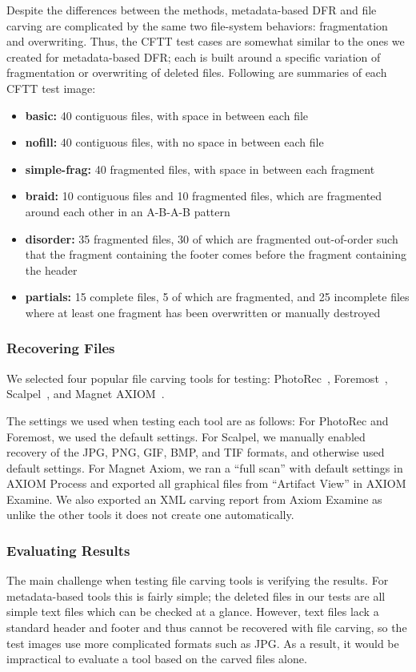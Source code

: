 Despite the differences between the methods, metadata-based DFR and file carving are complicated by the same two file-system behaviors: fragmentation and overwriting. Thus, the CFTT test cases are somewhat similar to the ones we created for metadata-based DFR; each is built around a specific variation of fragmentation or overwriting of deleted files.
Following are summaries of each CFTT test image:
\begin{itemize}
 \item \textbf{basic:} 40 contiguous files, with space in between each file
 \item \textbf{nofill:} 40 contiguous files, with no space in between each file
 \item \textbf{simple-frag:} 40 fragmented files, with space in between each fragment
 \item \textbf{braid:} 10 contiguous files and 10 fragmented files, which are fragmented around each other in an A-B-A-B pattern
 \item \textbf{disorder:} 35 fragmented files, 30 of which are fragmented out-of-order such that the fragment containing the footer comes before the fragment containing the header
 \item \textbf{partials:} 15 complete files, 5 of which are fragmented, and 25 incomplete files where at least one fragment has been overwritten or manually destroyed

\end{itemize}


\subsubsection{Recovering Files}

 We selected four popular file carving tools for testing: PhotoRec~\cite{photorec}, Foremost~\cite{foremost}, Scalpel~\cite{scalpel}, and Magnet AXIOM~\cite{axiom}.

The settings we used when testing each tool are as follows:
For PhotoRec and Foremost, we used the default settings.
For Scalpel, we manually enabled recovery of the JPG, PNG, GIF, BMP, and TIF formats, and otherwise used default settings.
For Magnet Axiom, we ran a ``full scan'' with default settings in AXIOM Process and exported all graphical files from ``Artifact View'' in AXIOM Examine.
We also exported an XML carving report from Axiom Examine as unlike the other tools it does not create one automatically.

\subsubsection{Evaluating Results}
The main challenge when testing file carving tools is verifying the results. 
For metadata-based tools this is fairly simple; the deleted files in our tests are all simple text files which can be checked at a glance.
However, text files lack a standard header and footer and thus cannot be recovered with file carving, so the test images use more complicated formats such as JPG.
As a result, it would be impractical to evaluate a tool based on the carved files alone.

